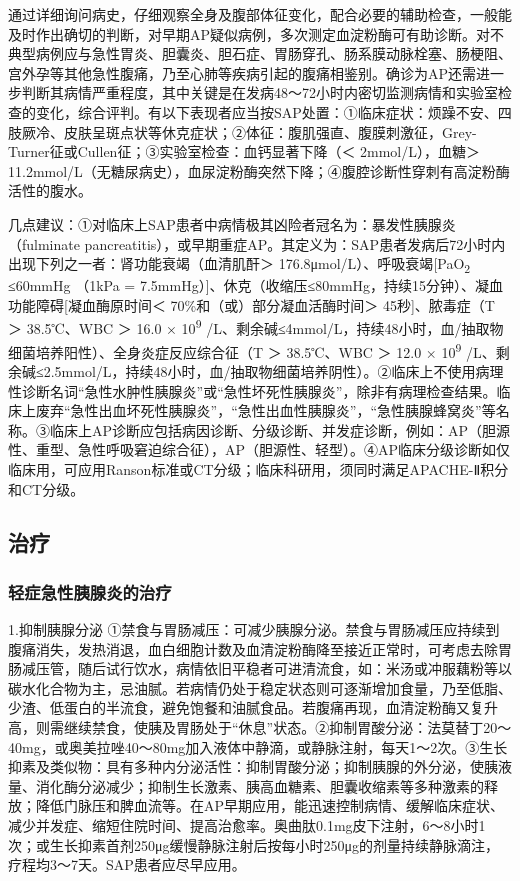 通过详细询问病史，仔细观察全身及腹部体征变化，配合必要的辅助检查，一般能及时作出确切的判断，对早期AP疑似病例，多次测定血淀粉酶可有助诊断。对不典型病例应与急性胃炎、胆囊炎、胆石症、胃肠穿孔、肠系膜动脉栓塞、肠梗阻、宫外孕等其他急性腹痛，乃至心肺等疾病引起的腹痛相鉴别。确诊为AP还需进一步判断其病情严重程度，其中关键是在发病48～72小时内密切监测病情和实验室检查的变化，综合评判。有以下表现者应当按SAP处置：①临床症状：烦躁不安、四肢厥冷、皮肤呈斑点状等休克症状；②体征：腹肌强直、腹膜刺激征，Grey-Turner征或Cullen征；③实验室检查：血钙显著下降（＜
2mmol/L），血糖＞
11.2mmol/L（无糖尿病史），血尿淀粉酶突然下降；④腹腔诊断性穿刺有高淀粉酶活性的腹水。

几点建议：①对临床上SAP患者中病情极其凶险者冠名为：暴发性胰腺炎（fulminate
pancreatitis），或早期重症AP。其定义为：SAP患者发病后72小时内出现下列之一者：肾功能衰竭（血清肌酐＞
176.8μmol/L）、呼吸衰竭{[}PaO\textsubscript{2} ≤60mmHg （1kPa =
7.5mmHg）{]}、休克（收缩压≤80mmHg，持续15分钟）、凝血功能障碍{[}凝血酶原时间＜
70\%和（或）部分凝血活酶时间＞ 45秒{]}、脓毒症（T ＞ 38.5℃、WBC ＞ 16.0
× 10\textsuperscript{9}
/L、剩余碱≤4mmol/L，持续48小时，血/抽取物细菌培养阳性）、全身炎症反应综合征（T
＞ 38.5℃、WBC ＞ 12.0 × 10\textsuperscript{9}
/L、剩余碱≤2.5mmol/L，持续48小时，血/抽取物细菌培养阴性）。②临床上不使用病理性诊断名词“急性水肿性胰腺炎”或“急性坏死性胰腺炎”，除非有病理检查结果。临床上废弃“急性出血坏死性胰腺炎”，“急性出血性胰腺炎”，“急性胰腺蜂窝炎”等名称。③临床上AP诊断应包括病因诊断、分级诊断、并发症诊断，例如：AP（胆源性、重型、急性呼吸窘迫综合征），AP（胆源性、轻型）。④AP临床分级诊断如仅临床用，可应用Ranson标准或CT分级；临床科研用，须同时满足APACHE-Ⅱ积分和CT分级。

\subsection{治疗}

\subsubsection{轻症急性胰腺炎的治疗}

1.抑制胰腺分泌
①禁食与胃肠减压：可减少胰腺分泌。禁食与胃肠减压应持续到腹痛消失，发热消退，血白细胞计数及血清淀粉酶降至接近正常时，可考虑去除胃肠减压管，随后试行饮水，病情依旧平稳者可进清流食，如：米汤或冲服藕粉等以碳水化合物为主，忌油腻。若病情仍处于稳定状态则可逐渐增加食量，乃至低脂、少渣、低蛋白的半流食，避免饱餐和油腻食品。若腹痛再现，血清淀粉酶又复升高，则需继续禁食，使胰及胃肠处于“休息”状态。②抑制胃酸分泌：法莫替丁20～40mg，或奥美拉唑40～80mg加入液体中静滴，或静脉注射，每天1～2次。③生长抑素及类似物：具有多种内分泌活性：抑制胃酸分泌；抑制胰腺的外分泌，使胰液量、消化酶分泌减少；抑制生长激素、胰高血糖素、胆囊收缩素等多种激素的释放；降低门脉压和脾血流等。在AP早期应用，能迅速控制病情、缓解临床症状、减少并发症、缩短住院时间、提高治愈率。奥曲肽0.1mg皮下注射，6～8小时1次；或生长抑素首剂250μg缓慢静脉注射后按每小时250μg的剂量持续静脉滴注，疗程均3～7天。SAP患者应尽早应用。

